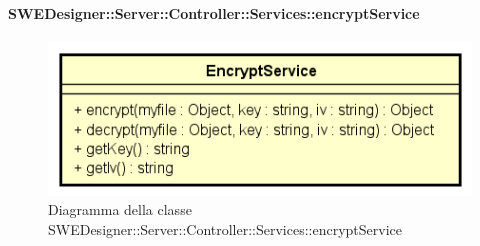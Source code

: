       \paragraph{SWEDesigner::Server::Controller::Services::encryptService}
      	\begin{figure}[h!]
		\centering
		\includegraphics[scale=0.8]{Classi/EncryptService.png}
		\caption{Diagramma della classe SWEDesigner::Server::Controller::Services::encryptService}
 		\end{figure}
